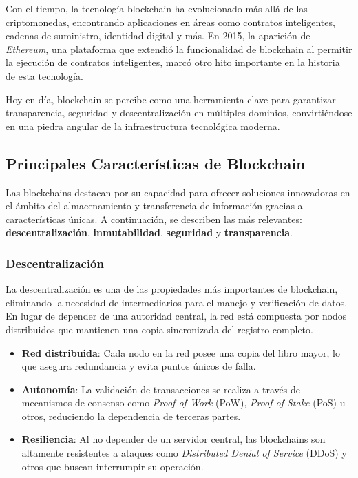 Con el tiempo, la tecnología blockchain ha evolucionado más allá de las criptomonedas, encontrando aplicaciones en áreas como contratos inteligentes, cadenas de suministro, identidad digital y más. En 2015, la aparición de \textit{Ethereum}, una plataforma que extendió la funcionalidad de blockchain al permitir la ejecución de contratos inteligentes, marcó otro hito importante en la historia de esta tecnología.

Hoy en día, blockchain se percibe como una herramienta clave para garantizar transparencia, seguridad y descentralización en múltiples dominios, convirtiéndose en una piedra angular de la infraestructura tecnológica moderna.

\subsection{Principales Características de Blockchain}

Las blockchains destacan por su capacidad para ofrecer soluciones innovadoras en el ámbito del almacenamiento y transferencia de información gracias a características únicas. A continuación, se describen las más relevantes: \textbf{descentralización}, \textbf{inmutabilidad}, \textbf{seguridad} y \textbf{transparencia}.

\subsubsection{Descentralización}  
La descentralización es una de las propiedades más importantes de blockchain, eliminando la necesidad de intermediarios para el manejo y verificación de datos. En lugar de depender de una autoridad central, la red está compuesta por nodos distribuidos que mantienen una copia sincronizada del registro completo. 

\begin{itemize}
    \item \textbf{Red distribuida}: Cada nodo en la red posee una copia del libro mayor, lo que asegura redundancia y evita puntos únicos de falla.
    \item \textbf{Autonomía}: La validación de transacciones se realiza a través de mecanismos de consenso como \textit{Proof of Work} (PoW), \textit{Proof of Stake} (PoS) u otros, reduciendo la dependencia de terceras partes.
    \item \textbf{Resiliencia}: Al no depender de un servidor central, las blockchains son altamente resistentes a ataques como \textit{Distributed Denial of Service} (DDoS) y otros que buscan interrumpir su operación.
\end{itemize}

